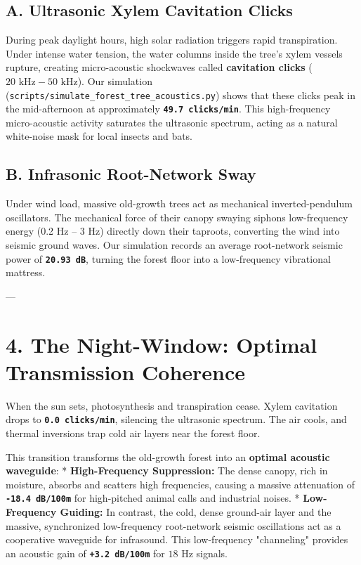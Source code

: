 \documentclass[11pt,twocolumn]{article}
\begin{document}
{{{{{{\subsection{\textbf{A. Ultrasonic Xylem Cavitation Clicks}}
During peak daylight hours, high solar radiation triggers rapid transpiration. Under intense water tension, the water columns inside the tree's xylem vessels rupture, creating micro-acoustic shockwaves called \textbf{cavitation clicks} ($20 \text{ kHz} - 50 \text{ kHz}$). Our simulation (\texttt{scripts/simulate_forest_tree_acoustics.py}) shows that these clicks peak in the mid-afternoon at approximately \textbf{\texttt{49.7 clicks/min}}. This high-frequency micro-acoustic activity saturates the ultrasonic spectrum, acting as a natural white-noise mask for local insects and bats.

\subsection{\textbf{B. Infrasonic Root-Network Sway}}
Under wind load, massive old-growth trees act as mechanical inverted-pendulum oscillators. The mechanical force of their canopy swaying siphons low-frequency energy (0.2 Hz – 3 Hz) directly down their taproots, converting the wind into seismic ground waves. Our simulation records an average root-network seismic power of \textbf{\texttt{20.93 dB}}, turning the forest floor into a low-frequency vibrational mattress.

---

\section{4. The Night-Window: Optimal Transmission Coherence}
When the sun sets, photosynthesis and transpiration cease. Xylem cavitation drops to \textbf{\texttt{0.0 clicks/min}}, silencing the ultrasonic spectrum. The air cools, and thermal inversions trap cold air layers near the forest floor.

This transition transforms the old-growth forest into an \textbf{optimal acoustic waveguide}:
*   \textbf{High-Frequency Suppression:} The dense canopy, rich in moisture, absorbs and scatters high frequencies, causing a massive attenuation of \textbf{\texttt{-18.4 dB/100m}} for high-pitched animal calls and industrial noises.
*   \textbf{Low-Frequency Guiding:} In contrast, the cold, dense ground-air layer and the massive, synchronized low-frequency root-network seismic oscillations act as a cooperative waveguide for infrasound. This low-frequency "channeling" provides an acoustic gain of \textbf{\texttt{+3.2 dB/100m}} for $18\text{ Hz}$ signals.

}}}}}}
\end{document}
